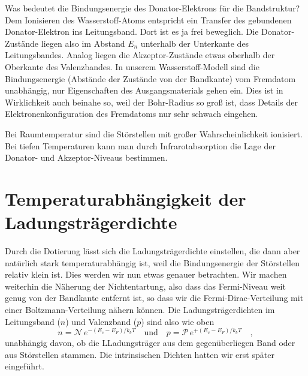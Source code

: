 Was bedeutet die Bindungsenergie des Donator-Elektrons für die Bandstruktur? Dem Ionisieren des Wasserstoff-Atoms entspricht ein Transfer des gebundenen Donator-Elektron ins Leitungsband. Dort ist es ja frei beweglich. Die Donator-Zustände liegen also im Abstand $E_n$ unterhalb der Unterkante des Leitungsbandes. Analog liegen die Akzeptor-Zustände etwas oberhalb der Oberkante des Valenzbandes. In unserem Wasserstoff-Modell sind die Bindungsenergie (Abstände der Zustände von der Bandkante) vom Fremdatom unabhängig, nur Eigenschaften des Ausgangsmaterials gehen ein. Dies ist in Wirklichkeit auch beinahe so, weil der Bohr-Radius so groß ist, dass Details der Elektronenkonfiguration des Fremdatoms nur sehr schwach eingehen.

Bei Raumtemperatur sind die Störstellen mit großer Wahrscheinlichkeit ionisiert. Bei tiefen Temperaturen kann man durch Infrarotabsorption die Lage der Donator- und Akzeptor-Niveaus bestimmen.


\section{Temperaturabhängigkeit der Ladungsträgerdichte}

Durch die Dotierung lässt sich die Ladungsträgerdichte einstellen, die dann aber natürlich stark temperaturabhängig ist, weil die Bindungsenergie der Störstellen relativ klein ist. Dies werden wir nun etwas genauer betrachten. Wir machen weiterhin die Näherung der Nichtentartung, also dass das Fermi-Niveau weit genug von der Bandkante entfernt ist, so dass wir die Fermi-Dirac-Verteilung mit einer Boltzmann-Verteilung nähern können. Die Ladungsträgerdichten im Leitungsband ($n$) und Valenzband ($p$) sind also wie oben
\begin{equation}
    n  = \mathcal{N} \, e^{- (E_c - E_F) / k_b T} \quad \text{und} \quad   
    p =  \mathcal{P} \, e^{+ (E_v - E_F) / k_b T} \quad , \label{eq:5_np_eff}
\end{equation}
unabhängig davon, ob die LLadungsträger aus dem gegenüberliegen Band oder aus Störstellen stammen. Die intrinsischen Dichten hatten wir erst später eingeführt.

